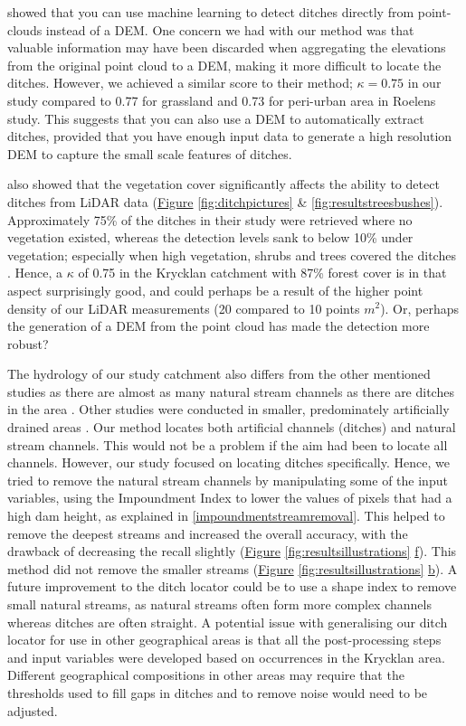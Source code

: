 \documentclass[]{interact}
\theoremstyle{plain}%
\theoremstyle{definition}
\theoremstyle{remark}
\begin{document}
\citet{roelens} showed that you can use machine learning to detect ditches directly from point-clouds instead of a DEM. One concern we had with our method was that valuable information may have been discarded when aggregating the elevations from the original point cloud to a DEM, making it more difficult to locate the ditches. However, we achieved a similar score to their method; $\kappa=0.75$ in our study compared to 0.77 for grassland and 0.73 for peri-urban area in Roelens study. This suggests that you can also use a DEM to automatically extract ditches, provided that you have enough input data to generate a high resolution DEM to capture the small scale features of ditches. 

\citet{bailly} also showed that the vegetation cover significantly affects the ability to detect ditches from LiDAR data (\hyperref[fig:ditchpictures]{Figure} \ref{fig:ditchpictures} \& \ref{fig:resultstreesbushes}). Approximately 75\% of the ditches in their study were retrieved where no vegetation existed, whereas the detection levels sank to below 10\% under vegetation; especially when high vegetation, shrubs and trees covered the ditches \citep{bailly}. Hence, a $\kappa$ of 0.75 in the Krycklan catchment with  87\% forest cover \citep{krycklancatchment} is in that aspect surprisingly good, and could perhaps be a result of the higher point density of our LiDAR measurements (20 compared to 10 points $m^{2}$). Or, perhaps the generation of a DEM from the point cloud has made the detection more robust?  

The hydrology of our study catchment also differs from the other mentioned studies as there are almost as many natural stream channels as there are ditches in the area \citep{hasselquist, mappingtemporal}. Other studies were conducted in smaller, predominately artificially drained areas \citep{roelens, bailly, rapinel}. Our method locates both artificial channels (ditches) and natural stream channels. This would not be a problem if the aim had been to locate all channels. However, our study focused on locating ditches specifically. Hence, we tried to remove the natural stream channels by manipulating some of the input variables, using the Impoundment Index to lower the values of pixels that had a high dam height, as explained in \ref{impoundmentstreamremoval}. This helped to remove the deepest streams and increased the overall accuracy, with the drawback of decreasing the recall slightly (\hyperref[fig:resultsillustrations]{Figure} \ref{fig:resultsillustrations} \hyperref[fig:resultsillustrations]{f}). This method did not remove the smaller streams (\hyperref[fig:resultsillustrations]{Figure} \ref{fig:resultsillustrations} \hyperref[fig:resultsillustrations]{b}). A future improvement to the ditch locator could be to use a shape index to remove small natural streams, as natural streams often form more complex channels whereas ditches are often straight. A potential issue with generalising our ditch locator for use in other geographical areas is that all the post-processing steps and input variables were developed based on occurrences in the Krycklan area. Different geographical compositions in other areas may require that the thresholds used to fill gaps in ditches and to remove noise would need to be adjusted.
\end{document}
